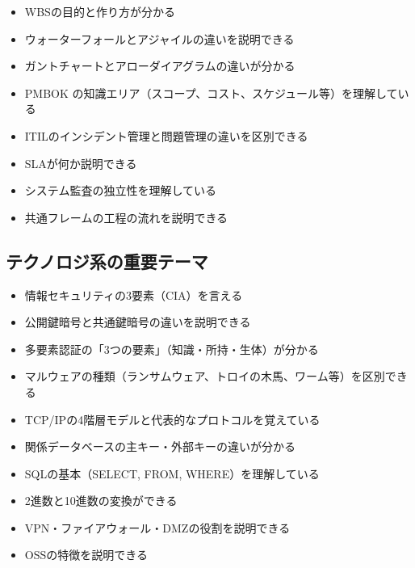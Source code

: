 \begin{itemize}
  \item[$\square$] WBSの目的と作り方が分かる
  \item[$\square$] ウォーターフォールとアジャイルの違いを説明できる
  \item[$\square$] ガントチャートとアローダイアグラムの違いが分かる
  \item[$\square$] PMBOK の知識エリア（スコープ、コスト、スケジュール等）を理解している
  \item[$\square$] ITILのインシデント管理と問題管理の違いを区別できる
  \item[$\square$] SLAが何か説明できる
  \item[$\square$] システム監査の独立性を理解している
  \item[$\square$] 共通フレームの工程の流れを説明できる
\end{itemize}

\subsection*{テクノロジ系の重要テーマ}

\begin{itemize}
  \item[$\square$] 情報セキュリティの3要素（CIA）を言える
  \item[$\square$] 公開鍵暗号と共通鍵暗号の違いを説明できる
  \item[$\square$] 多要素認証の「3つの要素」（知識・所持・生体）が分かる
  \item[$\square$] マルウェアの種類（ランサムウェア、トロイの木馬、ワーム等）を区別できる
  \item[$\square$] TCP/IPの4階層モデルと代表的なプロトコルを覚えている
  \item[$\square$] 関係データベースの主キー・外部キーの違いが分かる
  \item[$\square$] SQLの基本（SELECT, FROM, WHERE）を理解している
  \item[$\square$] 2進数と10進数の変換ができる
  \item[$\square$] VPN・ファイアウォール・DMZの役割を説明できる
  \item[$\square$] OSSの特徴を説明できる
\end{itemize}

\vspace{1em}

